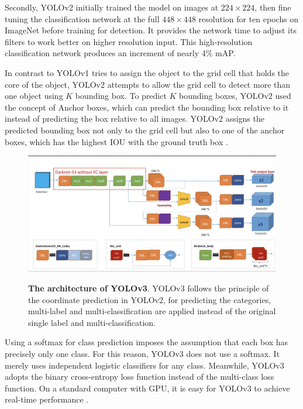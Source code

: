 Secondly, YOLOv2  \cite{ yolov2} initially trained the model on images at $224\times224$, then ﬁne tuning the classiﬁcation network at the full $448\times448$ resolution for ten epochs on ImageNet before training for detection.  It provides the network time to adjust its ﬁlters to work better on higher resolution input. This high-resolution classiﬁcation network produces an increment of nearly 4\% mAP\cite{yolov2}.

In contrast to YOLOv1 \cite{ yolov1} tries to assign the object to the grid cell that holds the core of the object,  YOLOv2 \cite{ yolov2} attempts to allow the grid cell to detect more than one object using  $K$ bounding box. To predict $ K$ bounding boxes, YOLOv2 used the concept of Anchor boxes\cite{ yolov2}, which can predict the bounding box relative to it instead of predicting the box relative to all images.   YOLOv2 assigns the predicted bounding box not only to the grid cell but also to one of the anchor boxes, which has the highest IOU with the ground truth box \cite{yolov2}. 


\begin{figure}[t]
\begin{center}
\centering
\includegraphics[width=\textwidth]{thesis-template-master/images/yolov3.png}
\label{fig:cellnet}

\end{center}
\caption{\textbf{The architecture of YOLOv3}. YOLOv3\cite{33} follows the principle of the coordinate prediction in YOLOv2\cite{yolov2}, for predicting the categories, multi-label and multi-classification are applied instead of the original single label and multi-classification.}
\label{fig:2.4}
\end{figure}

Using a softmax for class prediction imposes the assumption that each box has precisely only one class. For this reason, YOLOv3 \cite{33} does not use a softmax. It merely uses independent logistic classiﬁers for any class. Meanwhile, YOLOv3\cite{33} adopts the binary cross-entropy loss function instead of the multi-class loss function. On a standard computer with GPU, it is easy for YOLOv3 to achieve real-time performance \cite{18}.  

